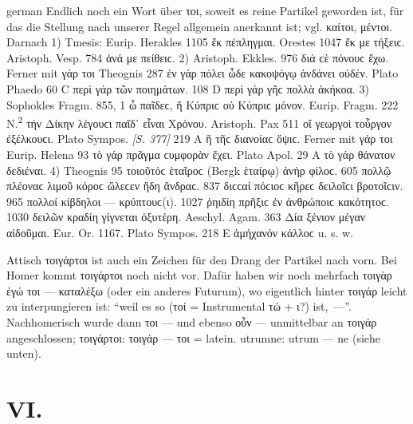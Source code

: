 \begin{otherlanguage*}{german}
Endlich noch ein Wort über τοι, soweit es reine Partikel geworden ist, für das die Stellung nach unserer Regel allgemein anerkannt ist; vgl. καίτοι, μέντοι. Darnach 1) Tmesis: Eurip. Herakles 1105 ἔκ  πέπληγμαι. Orestes 1047 ἔκ  με τήξειϲ. Aristoph. Vesp. 784 ἀνά  με πείθειϲ. 2) Aristoph. Ekkles. 976 διά  ϲὲ πόνουϲ ἔχω. Ferner mit γάρ τοι Theognis 287 ἐν γάρ  πόλει ὧδε κακοψόγῳ ἁνδάνει οὐδέν. Plato Phaedo 60 C περὶ γάρ  τῶν ποιημάτων. 108 D περὶ γάρ  γῆϲ πολλὰ ἀκήκοα. 3) Sophokles Fragm. 855, 1 ὦ παῖδεϲ, ἥ  Κύπριϲ οὐ Κύπριϲ μόνον. Eurip. Fragm. 222 Ν.\textsuperscript{2} τήν  Δίκην λέγουϲι παῖδ᾽ εἶναι Χρόνου. Aristoph. Pax 511 οἵ  γεωργοὶ τοὖργον ἐξέλκουϲι. Plato Sympos. \hypertarget{p377}{\emph{[S. 377]}}\label{p377} 219 A ἥ  τῆϲ διανοίαϲ ὄψιϲ. Ferner mit γάρ τοι Eurip. Helena 93 τὸ γάρ  πρᾶγμα ϲυμφορὰν ἔχει. Plato Apol. 29 Α τὸ γάρ  θάνατον δεδιέναι. 4) Theognis 95 τοιοῦτόϲ  ἑταῖροϲ (Bergk ἑταίρῳ) ἀνὴρ φίλοϲ. 605 πολλῷ  πλέοναϲ λιμοῦ κόροϲ ὤλεϲεν ἤδη ἄνδραϲ. 837 διϲϲαί  πόϲιοϲ κῆρεϲ δειλοῖϲι βροτοῖϲιν. 965 πολλοί  κίβδηλοι — κρύπτουϲ(ι). 1027 ῥηιδίη  πρῆξιϲ ἐν ἀνθρώποιϲ κακότητοϲ. 1030 δειλῶν  κραδίη γίγνεται ὀξυτέρη. Aeschyl. Agam. 363 Δία  ξένιον μέγαν αἰδοῦμαι. Eur. Or. 1167. Plato Sympos. 218 Ε ἀμήχανόν  κάλλοϲ u. s. w.

Attisch τοιγάρτοι ist auch ein Zeichen für den Drang der Partikel nach vorn. Bei Homer kommt τοιγάρτοι noch nicht vor. Dafür haben wir noch mehrfach τοιγὰρ ἐγώ τοι — καταλέξω (oder ein anderes Futurum), wo eigentlich hinter τοιγάρ leicht zu interpungieren ist: “weil es so (τοί = Instrumental τώ + ι?) ist,~\mbox{—”.} Nachhomerisch wurde dann τοι — und ebenso οὖν — unmittelbar an τοιγάρ angeschlossen; τοιγάρτοι: τοιγάρ — τοι = latein. utrumne: utrum — ne (siehe unten).

\section*{VI.}


\end{otherlanguage*}
